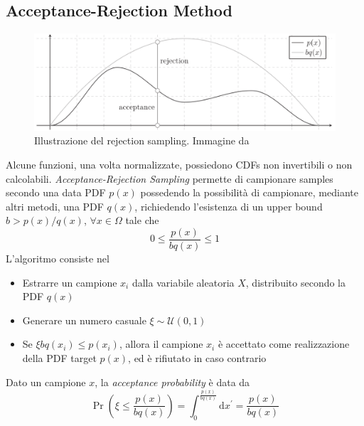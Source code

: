 \subsection{Acceptance-Rejection Method}
\begin{figure}[tb]
	\centering
	\includegraphics[width=0.8\linewidth]{../assets/chapter6_sampling_acceptance_rejection.png}
	\caption{Illustrazione del rejection sampling. Immagine da \cite{pegoraro}}
	\label{chapter6:sampling:rejectionSampling}
\end{figure}
Alcune funzioni, una volta normalizzate\footnotemark{}, possiedono CDFs non invertibili o non calcolabili. \textit{Acceptance-Rejection Sampling} 
permette di campionare samples secondo una data PDF $p(x)$ possedendo la possibilit\`a di campionare, mediante altri metodi, una PDF $q(x)$, 
richiedendo l'esistenza di un upper bound $b>p(x)/q(x)$, $\forall x\in\Omega$ tale che
\begin{equation}
	0\leq\frac{p(x)}{bq(x)}\leq 1
\end{equation}
L'algoritmo consiste nel
\begin{itemize}[topsep=0pt,noitemsep]
	\item Estrarre un campione $x_i$ dalla variabile aleatoria $X$, distribuito secondo la PDF $q(x)$
	\item Generare un numero casuale $\xi\sim\mathcal{U}(0,1)$
	\item Se $\xi bq(x_i)\leq p(x_i)$, allora il campione $x_i$ \`e accettato come realizzazione della PDF target $p(x)$, ed \`e rifiutato in caso
		contrario
\end{itemize}
Dato un campione $x$, la \textit{acceptance probability} \`e data da
\begin{equation}
	\Pr\left(\xi\leq\frac{p(x)}{bq(x)}\right)=\int_0^{\frac{p(x)}{bq(x)}}\mathrm{d}x^\prime=\frac{p(x)}{bq(x)}
\end{equation}
